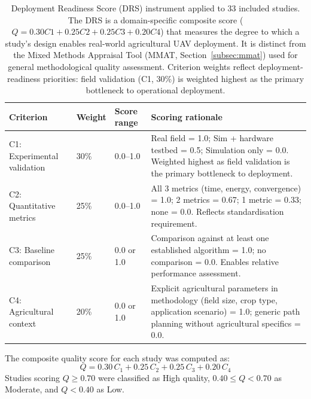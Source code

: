 \documentclass[review,3p,times]{elsarticle}
\begin{document}
\begin{table}[htbp]
\centering
\caption{Deployment Readiness Score (DRS) instrument applied to 33 included studies. The DRS is a domain-specific composite score ($Q = 0.30 C1 + 0.25 C2 + 0.25 C3 + 0.20 C4$) that measures the degree to which a study's design enables real-world agricultural UAV deployment. It is distinct from the Mixed Methods Appraisal Tool (MMAT, Section~\ref{subsec:mmat}) used for general methodological quality assessment. Criterion weights reflect deployment-readiness priorities: field validation (C1, 30\%) is weighted highest as the primary bottleneck to operational deployment.}
\label{tab:quality_criteria}
\begin{tabularx}{\textwidth}{lllX}
\toprule
\textbf{Criterion} & \textbf{Weight} & \textbf{Score range} & \textbf{Scoring rationale} \\
\midrule
C1: Experimental validation & 30\% & 0.0--1.0 & Real field = 1.0; Sim + hardware testbed = 0.5; Simulation only = 0.0. Weighted highest as field validation is the primary bottleneck to deployment. \\
C2: Quantitative metrics & 25\% & 0.0--1.0 & All 3 metrics (time, energy, convergence) = 1.0; 2 metrics = 0.67; 1 metric = 0.33; none = 0.0. Reflects standardisation requirement. \\
C3: Baseline comparison & 25\% & 0.0 or 1.0 & Comparison against at least one established algorithm = 1.0; no comparison = 0.0. Enables relative performance assessment. \\
C4: Agricultural context & 20\% & 0.0 or 1.0 & Explicit agricultural parameters in methodology (field size, crop type, application scenario) = 1.0; generic path planning without agricultural specifics = 0.0. \\
\bottomrule
\end{tabularx}
\end{table}

The composite quality score for each study was computed as:
\begin{equation}
Q = 0.30\,C_1 + 0.25\,C_2 + 0.25\,C_3 + 0.20\,C_4
\label{eq:drs}
\end{equation}
Studies scoring $Q \geq 0.70$ were classified as High quality, $0.40 \leq Q < 0.70$ as Moderate, and $Q < 0.40$ as Low.
\end{document}

